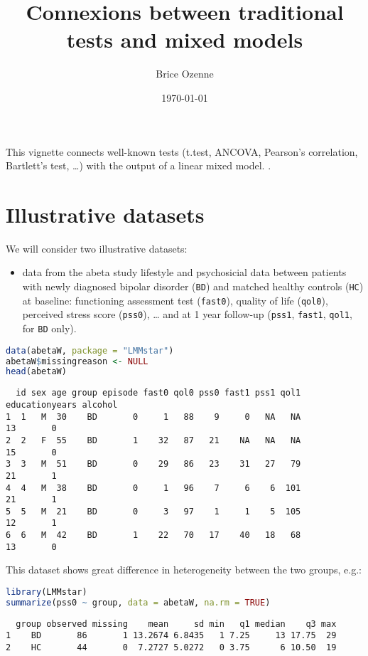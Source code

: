 \documentclass[12pt]{article}
\author{Brice Ozenne}
\date{\today}
\title{Connexions between traditional tests and mixed models}
\begin{document}
\maketitle
This vignette connects well-known tests (t.test, ANCOVA, Pearson's
correlation, Bartlett's test, \ldots) with the output of a linear
mixed model.  .
\section{Illustrative datasets}
\label{sec:org3857166}

We will consider two illustrative datasets:
\begin{itemize}
\item data from the abeta study lifestyle and psychosicial data between
patients with newly diagnosed bipolar disorder (\texttt{BD}) and matched
healthy controls (\texttt{HC}) at baseline: functioning assessment test
(\texttt{fast0}), quality of life (\texttt{qol0}), perceived stress score
(\texttt{pss0}), \ldots{} and at 1 year follow-up (\texttt{pss1}, \texttt{fast1}, \texttt{qol1}, for
\texttt{BD} only).
\end{itemize}
\begin{lstlisting}[language=r,numbers=none]
data(abetaW, package = "LMMstar")
abetaW$missingreason <- NULL
head(abetaW)
\end{lstlisting}

\label{}
\begin{verbatim}
  id sex age group episode fast0 qol0 pss0 fast1 pss1 qol1 educationyears alcohol
1  1   M  30    BD       0     1   88    9     0   NA   NA             13       0
2  2   F  55    BD       1    32   87   21    NA   NA   NA             15       0
3  3   M  51    BD       0    29   86   23    31   27   79             21       1
4  4   M  38    BD       0     1   96    7     6    6  101             21       1
5  5   M  21    BD       0     3   97    1     1    5  105             12       1
6  6   M  42    BD       1    22   70   17    40   18   68             13       0
\end{verbatim}


This dataset shows great difference in heterogeneity between the two groups, e.g.:
\begin{lstlisting}[language=r,numbers=none]
library(LMMstar)
summarize(pss0 ~ group, data = abetaW, na.rm = TRUE)
\end{lstlisting}

\label{}
\begin{verbatim}
  group observed missing    mean     sd min   q1 median    q3 max
1    BD       86       1 13.2674 6.8435   1 7.25     13 17.75  29
2    HC       44       0  7.2727 5.0272   0 3.75      6 10.50  19
\end{verbatim}
\end{document}
